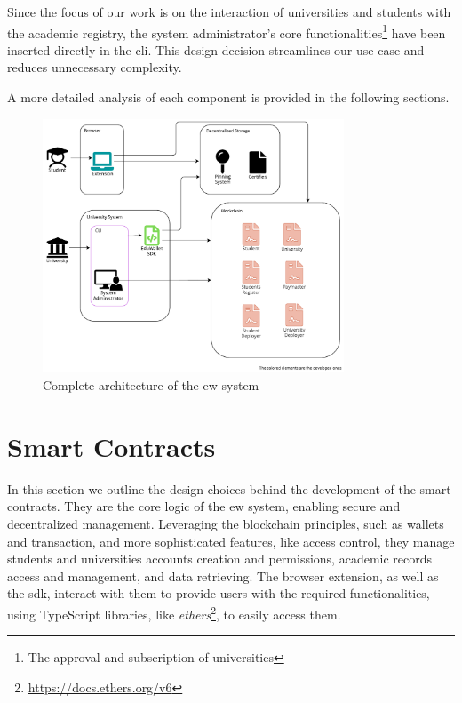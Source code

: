 Since the focus of our work is on the interaction of universities and students with the academic registry, the system administrator's core functionalities\footnote{The approval and subscription of universities} have been inserted directly in the \acrshort{cli}. This design decision streamlines our use case and reduces unnecessary complexity.

A more detailed analysis of each component is provided in the following sections.

\begin{figure}[htpb]
  \centering
  \includegraphics[width=0.8\textwidth]{figures/Architecture diagram complete.pdf}
  \caption[System architecture diagram]{Complete architecture of the \acrlong{ew} system}
  \label{fig:fullArchDiag}
\end{figure}

\section{Smart Contracts}
\label{sec:smartContractsDesign}
In this section we outline the design choices behind the development of the smart contracts. They are the core logic of the \acrshort{ew} system, enabling secure and decentralized management. Leveraging the blockchain principles, such as wallets and transaction, and more sophisticated features, like access control, they manage students and universities accounts creation and permissions, academic records access and management, and data retrieving. The browser extension, as well as the \acrshort{sdk}, interact with them to provide users with the required functionalities, using TypeScript libraries, like \textit{ethers}\footnote{\url{https://docs.ethers.org/v6}}, to easily access them.

